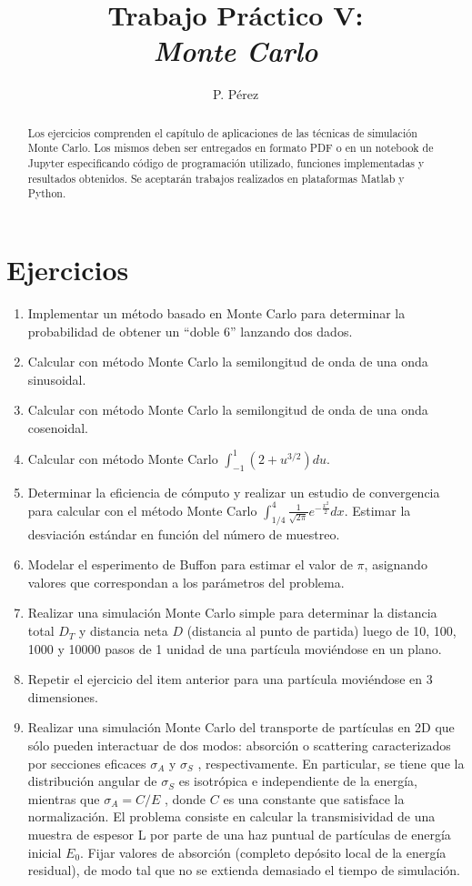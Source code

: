 \documentclass[a4paper,10pt]{article}
\title{{\bf Trabajo Práctico V:}\\ \emph{Monte Carlo}}
\author{P. Pérez}
\begin{document}
\maketitle

\begin{abstract}
Los ejercicios comprenden el capítulo de aplicaciones de las técnicas de simulación Monte Carlo. Los mismos deben ser entregados en formato PDF o en un notebook de Jupyter especificando código de programación utilizado, funciones implementadas y resultados obtenidos. Se aceptarán trabajos realizados en plataformas Matlab y Python.
\end{abstract}

\section*{Ejercicios}

\begin{enumerate}
 \item Implementar un método basado en Monte Carlo para determinar la probabilidad de obtener un ``doble 6'' lanzando dos dados.
 \item Calcular con método Monte Carlo la semilongitud de onda de una onda sinusoidal.
 \item Calcular con método Monte Carlo la semilongitud de onda de una onda cosenoidal.
 \item Calcular con método Monte Carlo $\int_{-1}^{1}(2 + u^{3/2}) du$.
 \item Determinar la eficiencia de cómputo y realizar un estudio de convergencia para calcular con el método Monte Carlo $\int_{1/4}^{4}\frac{1}{\sqrt{2\pi}}e^{-\frac{x^{2}}{2}}dx$. Estimar la desviación estándar en función del número de muestreo.
 \item Modelar el esperimento de Buffon para estimar el valor de $\pi$, asignando valores que correspondan a los parámetros del problema.
 \item Realizar una simulación Monte Carlo simple para determinar la distancia total $D_{T}$ y distancia neta $D$ (distancia al punto de partida) luego de 10, 100, 1000 y 10000 pasos de 1 unidad de una partícula moviéndose en un plano.
 \item Repetir el ejercicio del item anterior para una partícula moviéndose en 3 dimensiones.
 \item Realizar una simulación Monte Carlo del transporte de partículas en 2D que sólo pueden interactuar de dos modos: absorción o scattering caracterizados por secciones eficaces $\sigma_{A}$ y $\sigma_{S}$ , respectivamente. En particular, se tiene que la distribución angular de $\sigma_{S}$ es isotrópica e independiente de la energía, mientras que $\sigma_{A} = C/E$ , donde $C$ es una constante que satisface la normalización. El problema consiste en calcular la transmisividad de una muestra de espesor L por parte de una haz puntual de partículas de energía inicial $E_{0}$. Fijar valores de absorción (completo depósito local de la energía residual), de modo tal que no se extienda demasiado el tiempo de simulación.
 \end{enumerate}
\end{document}
